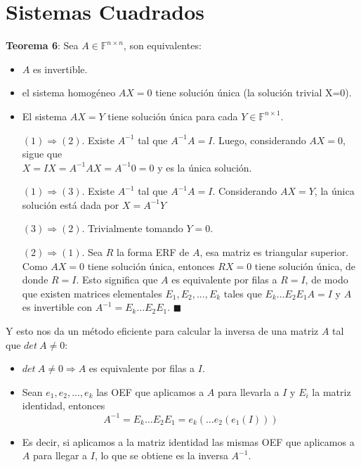\documentclass[11pt,a4paper]{article}
\newcommand*{\QEDA}{\null\nobreak\hfill\ensuremath{\blacksquare}}
\begin{document}
\section{Sistemas Cuadrados}
\textbf{Teorema 6}: Sea $A \in \mathbb{F}^{n \times n}$, son equivalentes:
\begin{itemize}
\itemsep-0.3em
\item $A$ es invertible.
\item el sistema homog\'eneo $AX=0$ tiene soluci\'on \'unica (la soluci\'on trivial X=0).
\item El sistema $AX=Y$ tiene soluci\'on \'unica para cada $Y \in \mathbb{F}^{n \times 1}$.
\end{itemize}
\begin{itemize}
\itemsep-0.3em
\item[$(1) \Rightarrow (2)$.] Existe $A^{-1}$ tal que $A^{-1}A = I$. Luego, considerando $AX = 0$, sigue que\\ $X = IX = A^{-1}AX = A^{-1}0=0$ y es la \'unica soluci\'on.
\item[$(1) \Rightarrow (3)$.] Existe $A^{-1}$ tal que $A^{-1}A = I$. Considerando $AX=Y$, la \'unica soluci\'on est\'a dada por $X=A^{-1}Y$
\item[$(3) \Rightarrow (2)$.] Trivialmente tomando $Y=0$.
\item[$(2) \Rightarrow (1)$.] Sea $R$ la forma ERF de $A$, esa matriz es triangular superior. Como $AX=0$ tiene soluci\'on \'unica, entonces $RX=0$ tiene soluci\'on \'unica, de donde $R=I$. Esto significa que $A$ es equivalente por filas a $R=I$, de modo que existen matrices elementales $E_1,E_2,...,E_k$ tales que $E_k\hdots E_2E_1A = I$ y $A$ es invertible con $A^{-1}=E_k\hdots E_2E_1$. \QEDA
\end{itemize}
Y esto nos da un m\'etodo eficiente para calcular la inversa de una matriz $A$ tal que $det\ A \not = 0$:
\begin{itemize}
\itemsep-0.3em
\item $det\ A \not = 0 \Rightarrow A$ es equivalente por filas a $I$.
\item Sean $e_1,e_2,...,e_k$ las OEF que aplicamos a $A$ para llevarla a $I$ y $E_i$ la matriz identidad, entonces $$A^{-1} = E_k\hdots E_2E_1 = e_k(\hdots e_2 (e_1(I)))$$
\item Es decir, si aplicamos a la matriz identidad las mismas OEF que aplicamos a $A$ para llegar a $I$, lo que se obtiene es la inversa $A^{-1}$.
\end{itemize}

\newpage 
\end{document}
